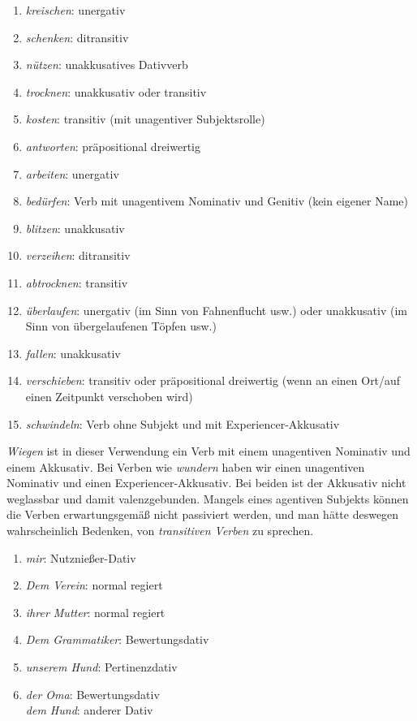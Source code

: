 \begin{enumerate}
  \item \textit{kreischen}: unergativ
  \item \textit{schenken}: ditransitiv
  \item \textit{nützen}: unakkusatives Dativverb
  \item \textit{trocknen}: unakkusativ oder transitiv
  \item \textit{kosten}: transitiv (mit unagentiver Subjektsrolle)
  \item \textit{antworten}: präpositional dreiwertig
  \item \textit{arbeiten}: unergativ
  \item \textit{bedürfen}: Verb mit unagentivem Nominativ und Genitiv (kein eigener Name)
  \item \textit{blitzen}: unakkusativ
  \item \textit{verzeihen}: ditransitiv
  \item \textit{abtrocknen}: transitiv
  \item \textit{überlaufen}: unergativ (im Sinn von Fahnenflucht usw.) oder unakkusativ (im Sinn von übergelaufenen Töpfen usw.)
  \item \textit{fallen}: unakkusativ
  \item \textit{verschieben}: transitiv oder präpositional dreiwertig (wenn an einen Ort\slash auf einen Zeitpunkt verschoben wird)
  \item \textit{schwindeln}: Verb ohne Subjekt und mit Experiencer-Akkusativ
\end{enumerate}

\label{sol:relationenundpraedikate03}

\textit{Wiegen} ist in dieser Verwendung ein Verb mit einem unagentiven Nominativ und einem Akkusativ.
Bei Verben wie \textit{wundern} haben wir einen unagentiven Nominativ und einen Experiencer-Akkusativ.
Bei beiden ist der Akkusativ nicht weglassbar und damit valenzgebunden.
Mangels eines agentiven Subjekts können die Verben erwartungsgemäß nicht passiviert werden, und man hätte deswegen wahrscheinlich Bedenken, von \textit{transitiven Verben} zu sprechen.

\label{sol:relationenundpraedikate04}

\begin{enumerate}
  \item \textit{mir}: Nutznießer-Dativ
  \item \textit{Dem Verein}: normal regiert
  \item \textit{ihrer Mutter}: normal regiert
  \item \textit{Dem Grammatiker}: Bewertungsdativ
  \item \textit{unserem Hund}: Pertinenzdativ
  \item \textit{der Oma}: Bewertungsdativ\\
    \textit{dem Hund}: anderer Dativ
\end{enumerate}

